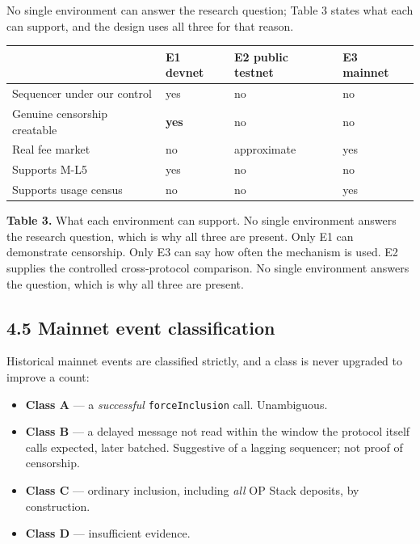 \documentclass[conference]{IEEEtran}
\providecommand{\tightlist}{\setlength{\itemsep}{0pt}\setlength{\parskip}{0pt}}
\renewcommand{\_}{\textunderscore\allowbreak}
\begin{document}
No single environment can answer the research question; Table 3 states
what each can support, and the design uses all three for that reason.

\begin{table}[!t]
\centering
\small
\begin{tabular}{@{}llll@{}}
\toprule
& E1 devnet & E2 public testnet & E3 mainnet \\
\midrule
Sequencer under our control & yes & no & no \\
Genuine censorship creatable & \textbf{yes} & no & no \\
Real fee market & no & approximate & yes \\
Supports M-L5 & yes & no & no \\
Supports usage census & no & no & yes \\
\bottomrule
\end{tabular}
\par\vspace{5pt}
{\footnotesize\raggedright \textbf{Table 3.} What each environment can support. No single
environment answers the research question, which is why all three are
present. Only E1 can demonstrate censorship. Only E3 can say how often
the mechanism is used. E2 supplies the controlled cross-protocol
comparison. No single environment answers the question, which is why all
three are present.\par}
\end{table}

\subsection{4.5 Mainnet event
classification}\label{mainnet-event-classification}

Historical mainnet events are classified strictly, and a class is never
upgraded to improve a count:

\begin{itemize}
\tightlist
\item
  \textbf{Class A} --- a \emph{successful} \texttt{forceInclusion} call.
  Unambiguous.
\item
  \textbf{Class B} --- a delayed message not read within the window the
  protocol itself calls expected, later batched. Suggestive of a lagging
  sequencer; not proof of censorship.
\item
  \textbf{Class C} --- ordinary inclusion, including \emph{all} OP Stack
  deposits, by construction.
\item
  \textbf{Class D} --- insufficient evidence.
\end{itemize}
\end{document}
